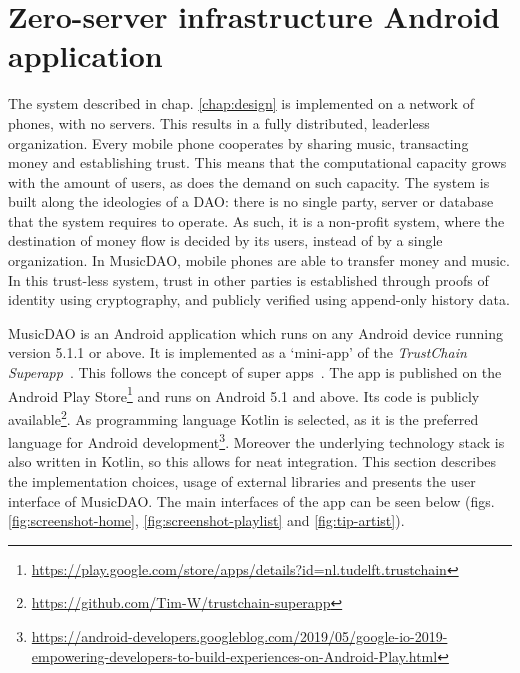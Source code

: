 \section{Zero-server infrastructure Android application}
The system described in chap. \ref{chap:design} is implemented on a network of phones, with no servers. This results in a fully distributed, leaderless organization. Every mobile phone cooperates by sharing music, transacting money and establishing trust. This means that the computational capacity grows with the amount of users, as does the demand on such capacity. The system is built along the ideologies of a DAO: there is no single party, server or database that the system requires to operate. As such, it is a non-profit system, where the destination of money flow is decided by its users, instead of by a single organization. In MusicDAO, mobile phones are able to transfer money and music. In this trust-less system, trust in other parties is established through proofs of identity using cryptography, and publicly verified using append-only history data.

MusicDAO is an Android application which runs on any Android device running version 5.1.1 or above. It is implemented as a `mini-app' of the \textit{TrustChain Superapp}~\citep{mattskala2020}. This follows the concept of super apps~\citep{kpmg2019superapps}. The app is published on the Android Play Store\footnote{\url{https://play.google.com/store/apps/details?id=nl.tudelft.trustchain}} and runs on Android 5.1 and above. Its code is publicly available\footnote{\url{https://github.com/Tim-W/trustchain-superapp}}. As programming language Kotlin is selected, as it is the preferred language for Android development\footnote{\url{https://android-developers.googleblog.com/2019/05/google-io-2019-empowering-developers-to-build-experiences-on-Android-Play.html}}. Moreover the underlying technology stack is also written in Kotlin, so this allows for neat integration. This section describes the implementation choices, usage of external libraries and presents the user interface of MusicDAO. The main interfaces of the app can be seen below (figs. \ref{fig:screenshot-home}, \ref{fig:screenshot-playlist} and \ref{fig:tip-artist}).

